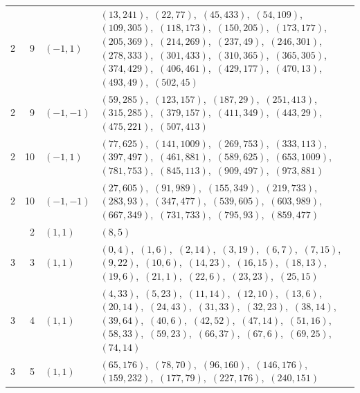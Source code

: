 \documentclass[11pt]{article}
\begin{document}
\begin{longtable}{@{}rrl>{\raggedright\arraybackslash}p{}@{}}
2 & 9 & $(-1,1)$ & $(13,241)$,\allowbreak\ $(22,77)$,\allowbreak\ $(45,433)$,\allowbreak\ $(54,109)$,\allowbreak\ $(109,305)$,\allowbreak\ $(118,173)$,\allowbreak\ $(150,205)$,\allowbreak\ $(173,177)$,\allowbreak\ $(205,369)$,\allowbreak\ $(214,269)$,\allowbreak\ $(237,49)$,\allowbreak\ $(246,301)$,\allowbreak\ $(278,333)$,\allowbreak\ $(301,433)$,\allowbreak\ $(310,365)$,\allowbreak\ $(365,305)$,\allowbreak\ $(374,429)$,\allowbreak\ $(406,461)$,\allowbreak\ $(429,177)$,\allowbreak\ $(470,13)$,\allowbreak\ $(493,49)$,\allowbreak\ $(502,45)$\\
2 & 9 & $(-1,-1)$ & $(59,285)$,\allowbreak\ $(123,157)$,\allowbreak\ $(187,29)$,\allowbreak\ $(251,413)$,\allowbreak\ $(315,285)$,\allowbreak\ $(379,157)$,\allowbreak\ $(411,349)$,\allowbreak\ $(443,29)$,\allowbreak\ $(475,221)$,\allowbreak\ $(507,413)$\\
2 & 10 & $(-1,1)$ & $(77,625)$,\allowbreak\ $(141,1009)$,\allowbreak\ $(269,753)$,\allowbreak\ $(333,113)$,\allowbreak\ $(397,497)$,\allowbreak\ $(461,881)$,\allowbreak\ $(589,625)$,\allowbreak\ $(653,1009)$,\allowbreak\ $(781,753)$,\allowbreak\ $(845,113)$,\allowbreak\ $(909,497)$,\allowbreak\ $(973,881)$\\
2 & 10 & $(-1,-1)$ & $(27,605)$,\allowbreak\ $(91,989)$,\allowbreak\ $(155,349)$,\allowbreak\ $(219,733)$,\allowbreak\ $(283,93)$,\allowbreak\ $(347,477)$,\allowbreak\ $(539,605)$,\allowbreak\ $(603,989)$,\allowbreak\ $(667,349)$,\allowbreak\ $(731,733)$,\allowbreak\ $(795,93)$,\allowbreak\ $(859,477)$\\
\addlinespace[3pt]
3 & 2 & $(1,1)$ & $(8,5)$\\
3 & 3 & $(1,1)$ & $(0,4)$,\allowbreak\ $(1,6)$,\allowbreak\ $(2,14)$,\allowbreak\ $(3,19)$,\allowbreak\ $(6,7)$,\allowbreak\ $(7,15)$,\allowbreak\ $(9,22)$,\allowbreak\ $(10,6)$,\allowbreak\ $(14,23)$,\allowbreak\ $(16,15)$,\allowbreak\ $(18,13)$,\allowbreak\ $(19,6)$,\allowbreak\ $(21,1)$,\allowbreak\ $(22,6)$,\allowbreak\ $(23,23)$,\allowbreak\ $(25,15)$\\
3 & 4 & $(1,1)$ & $(4,33)$,\allowbreak\ $(5,23)$,\allowbreak\ $(11,14)$,\allowbreak\ $(12,10)$,\allowbreak\ $(13,6)$,\allowbreak\ $(20,14)$,\allowbreak\ $(24,43)$,\allowbreak\ $(31,33)$,\allowbreak\ $(32,23)$,\allowbreak\ $(38,14)$,\allowbreak\ $(39,64)$,\allowbreak\ $(40,6)$,\allowbreak\ $(42,52)$,\allowbreak\ $(47,14)$,\allowbreak\ $(51,16)$,\allowbreak\ $(58,33)$,\allowbreak\ $(59,23)$,\allowbreak\ $(66,37)$,\allowbreak\ $(67,6)$,\allowbreak\ $(69,25)$,\allowbreak\ $(74,14)$\\
3 & 5 & $(1,1)$ & $(65,176)$,\allowbreak\ $(78,70)$,\allowbreak\ $(96,160)$,\allowbreak\ $(146,176)$,\allowbreak\ $(159,232)$,\allowbreak\ $(177,79)$,\allowbreak\ $(227,176)$,\allowbreak\ $(240,151)$\\

\end{longtable}
\end{document}

